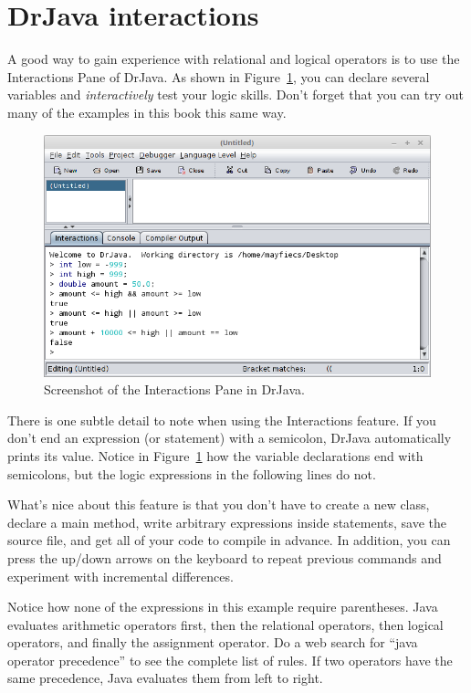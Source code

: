 \section{DrJava interactions}

A good way to gain experience with relational and logical operators is to use the Interactions Pane of DrJava.
As shown in Figure~\ref{fig:drjava}, you can declare several variables and {\it interactively} test your logic skills.
Don't forget that you can try out many of the examples in this book this same way.


\begin{figure}[!h]
\begin{center}
\includegraphics[width=\textwidth]{figs/drjava-logic.png}
\caption{Screenshot of the Interactions Pane in DrJava.}
\label{fig:drjava}
\end{center}
\end{figure}

There is one subtle detail to note when using the Interactions feature.
If you don't end an expression (or statement) with a semicolon, DrJava automatically prints its value.
Notice in Figure~\ref{fig:drjava} how the variable declarations end with semicolons, but the logic expressions in the following lines do not.

What's nice about this feature is that you don't have to create a new class, declare a main method, write arbitrary expressions inside  statements, save the source file, and get all of your code to compile in advance.
In addition, you can press the up/down arrows on the keyboard to repeat previous commands and experiment with incremental differences.


Notice how none of the expressions in this example require parentheses.
Java evaluates arithmetic operators first, then the relational operators, then logical operators, and finally the assignment operator.
Do a web search for ``java operator precedence'' to see the complete list of rules.
If two operators have the same precedence, Java evaluates them from left to right.

